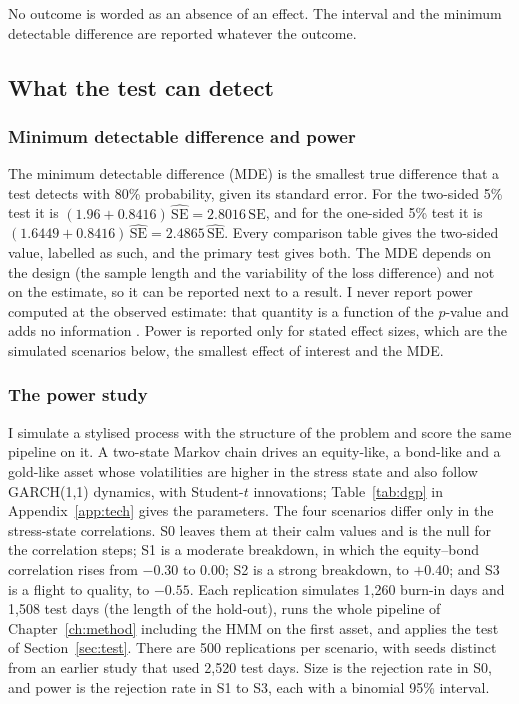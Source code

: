 No outcome is worded as an absence of an effect. The interval and the minimum detectable difference are reported whatever the outcome.

\subsection{What the test can detect}

\subsubsection{Minimum detectable difference and power}\label{sec:mde}

The minimum detectable difference (MDE) is the smallest true difference that a test detects with 80\% probability, given its standard error. For the two-sided 5\% test it is $(1.96+0.8416)\,\widehat{\mathrm{SE}}=2.8016\,\widehat{\mathrm{SE}}$, and for the one-sided 5\% test it is $(1.6449+0.8416)\,\widehat{\mathrm{SE}}=2.4865\,\widehat{\mathrm{SE}}$. Every comparison table gives the two-sided value, labelled as such, and the primary test gives both. The MDE depends on the design (the sample length and the variability of the loss difference) and not on the estimate, so it can be reported next to a result. I never report power computed at the observed estimate: that quantity is a function of the $p$-value and adds no information \citep{hoenig2001}. Power is reported only for stated effect sizes, which are the simulated scenarios below, the smallest effect of interest and the MDE.

\subsubsection{The power study}\label{sec:power-design}

I simulate a stylised process with the structure of the problem and score the same pipeline on it. A two-state Markov chain drives an equity-like, a bond-like and a gold-like asset whose volatilities are higher in the stress state and also follow GARCH(1,1) dynamics, with Student-$t$ innovations; Table~\ref{tab:dgp} in Appendix~\ref{app:tech} gives the parameters. The four scenarios differ only in the stress-state correlations. S0 leaves them at their calm values and is the null for the correlation steps; S1 is a moderate breakdown, in which the equity--bond correlation rises from $-0.30$ to $0.00$; S2 is a strong breakdown, to $+0.40$; and S3 is a flight to quality, to $-0.55$. Each replication simulates 1,260 burn-in days and 1,508 test days (the length of the hold-out), runs the whole pipeline of Chapter~\ref{ch:method} including the HMM on the first asset, and applies the test of Section~\ref{sec:test}. There are 500 replications per scenario, with seeds distinct from an earlier study that used 2,520 test days. Size is the rejection rate in S0, and power is the rejection rate in S1 to S3, each with a binomial 95\% interval.

